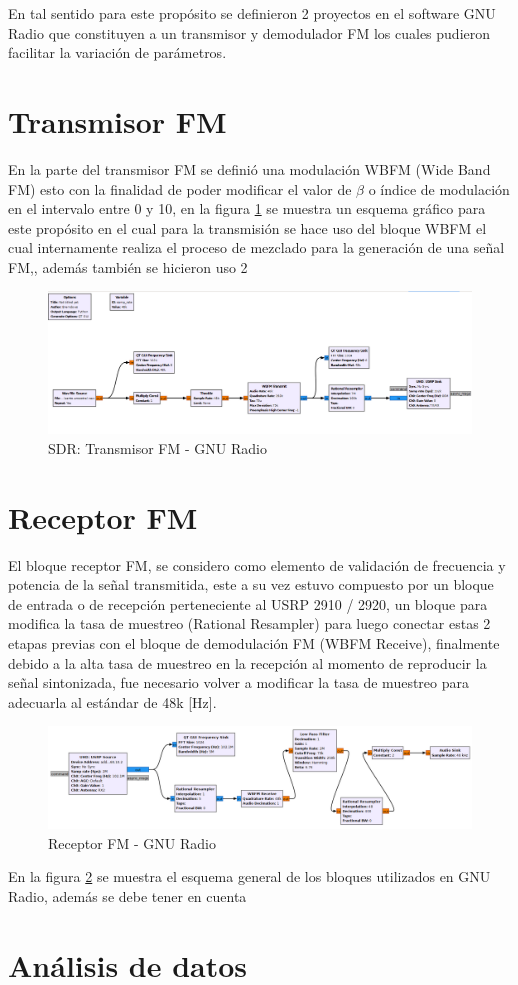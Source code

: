 \documentclass[conference]{IEEEtran}
\begin{document}
	En tal sentido para este propósito se definieron 2 proyectos en el software GNU Radio que constituyen a un transmisor y demodulador FM los cuales pudieron facilitar la variación de parámetros.
	
	\section{ Transmisor FM }
	
	En la parte del transmisor FM se definió una modulación WBFM (Wide Band FM) esto con la finalidad de poder modificar el valor de $\beta$ o índice de modulación en el intervalo entre 0 y 10, en la figura \ref{fig:transmisor-fm} se muestra un esquema gráfico para este propósito en el cual para la transmisión se hace uso del bloque WBFM el cual internamente realiza el proceso de mezclado para la generación de una señal FM,, además también se hicieron uso  2
	
	
	\begin{figure}[h]
		\centering
		\includegraphics[width=0.5\linewidth]{media/transmisor-fm}
		\caption{SDR: Transmisor FM - GNU Radio}
		\label{fig:transmisor-fm}
	\end{figure}
	
	
	\section{ Receptor FM }
	
	El bloque receptor FM, se considero como elemento de validación de frecuencia y potencia de la señal transmitida, este a su vez estuvo compuesto por un bloque de entrada o de recepción perteneciente al USRP 2910 / 2920, un bloque para modifica la tasa de muestreo (Rational Resampler) para luego conectar estas 2 etapas previas con el bloque de demodulación FM (WBFM Receive), finalmente debido a la alta tasa de muestreo en la recepción al momento de reproducir la señal sintonizada, fue necesario volver a modificar la tasa de muestreo para adecuarla al estándar de 48k [Hz].
	
	\begin{figure}[h]
		\centering
		\includegraphics[width=0.5\linewidth]{media/receptor-fm}
		\caption{Receptor FM - GNU Radio}
		\label{fig:receptor-fm}
	\end{figure}
	
	En la figura \ref{fig:receptor-fm} se muestra el esquema general de los bloques utilizados en GNU Radio, además se debe tener en cuenta
	
	\section{ Análisis de datos }
	
	
	
	
	
	
	
	
\end{document}
